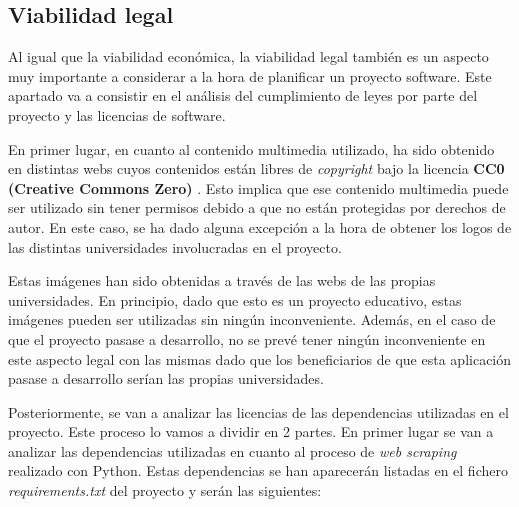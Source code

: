 \subsection{Viabilidad legal}
Al igual que la viabilidad económica, la viabilidad legal también es un aspecto muy importante a considerar a la hora de planificar un proyecto software. Este apartado va a consistir en el análisis del cumplimiento de leyes por parte del proyecto y las licencias de software. 

En primer lugar, en cuanto al contenido multimedia utilizado, ha sido obtenido en distintas webs cuyos contenidos están libres de \textit{copyright} bajo la licencia \textbf{CC0 (Creative Commons Zero)} \cite{codigoabierto:latex}. Esto implica que ese contenido multimedia puede ser utilizado sin tener permisos debido a que no están protegidas por derechos de autor. En este caso, se ha dado alguna excepción a la hora de obtener los logos de las distintas universidades involucradas en el proyecto.

Estas imágenes han sido obtenidas a través de las webs de las propias universidades. En principio, dado que esto es un proyecto educativo, estas imágenes pueden ser utilizadas sin ningún inconveniente. Además, en el caso de que el proyecto pasase a desarrollo, no se prevé tener ningún inconveniente en este aspecto legal con las mismas dado que los beneficiarios de que esta aplicación pasase a desarrollo serían las propias universidades.

Posteriormente, se van a analizar las licencias de las dependencias utilizadas en el proyecto. Este proceso lo vamos a dividir en 2 partes. En primer lugar se van a analizar las dependencias utilizadas en cuanto al proceso de \textit{web scraping} realizado con Python. Estas dependencias se han aparecerán listadas en el fichero \textit{requirements.txt} del proyecto y serán las siguientes:

